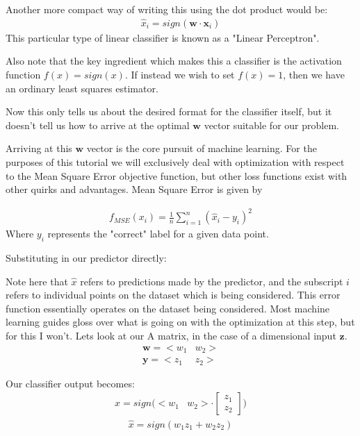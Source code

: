 \documentclass{article}
\begin{document}
Another more compact way of writing this using the dot product would be:
\begin{align*}
\hat{x}_i = sign(\mathbf{w} \cdot \mathbf{x}_i)
\end{align*}
This particular type of linear classifier is known as a "Linear Perceptron".

Also note that the key ingredient which makes this a classifier is the activation function $f(x)=sign(x)$. If instead we wish to set $f(x)=1$, then we have an ordinary least squares estimator.


Now this only tells us about the desired format for the classifier itself, but it doesn't tell us how to arrive at the optimal $\mathbf{w}$ vector suitable for our problem.

Arriving at this $\mathbf{w}$ vector is the core pursuit of machine learning. For the purposes of this tutorial we will exclusively deal with optimization with respect to the Mean Square Error objective function, but other loss functions exist with other quirks and advantages. Mean Square Error is given by

\begin{align*}
f_{MSE}(x_i) = \tfrac{1}{n} \sum_{i=1}^{n} (\hat{x}_i - y_i)^2
\end{align*}
Where $y_i$ represents the "correct" label for a given data point.

Substituting in our predictor directly:

Note here that $\hat{x}$ refers to predictions made by the predictor, and the subscript $i$ refers to individual points on the dataset which is being considered. This error function essentially operates on the dataset being considered. Most machine learning guides gloss over what is going on with the optimization at this step, but for this I won't. Lets look at our A matrix, in the case of a  dimensional input $\mathbf{z}$.
\begin{align*}
\mathbf{w} = <w_1 & w_2> \\ 	\mathbf{y} = <z_1 & z_2>
\end{align*}

Our classifier output becomes:
\begin{align*}
\hat{x} = sign( <w_1 & w_2> \cdot \begin{bmatrix} z_1 \\ z_2 \end{bmatrix})
\end{align*}
\begin{align*}
\hat{x} = sign( w_1z_1 + w_2 z_2 )
\end{align*}
\end{document}
